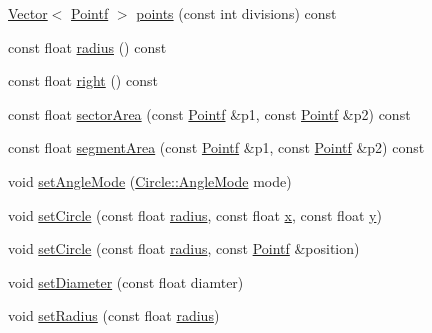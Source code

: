 \begin{DoxyCompactItemize}
\hyperlink{classprism_1_1containers_1_1_vector}{Vector}$<$ \hyperlink{classprism_1_1geometry_1_1_pointf}{Pointf} $>$ \hyperlink{classprism_1_1geometry_1_1_circle_a143bf607852529ec21a1aaaa9c34228f}{points} (const int divisions) const 
\item 
const float \hyperlink{classprism_1_1geometry_1_1_circle_aef97382c1f0b09dca59a0534ac03ed1b}{radius} () const 
\item 
const float \hyperlink{classprism_1_1geometry_1_1_circle_a72e405496fec43913c26325f115755c0}{right} () const 
\item 
const float \hyperlink{classprism_1_1geometry_1_1_circle_ac4151db62b33dc1f0eaaa0280f3334b7}{sector\+Area} (const \hyperlink{classprism_1_1geometry_1_1_pointf}{Pointf} \&p1, const \hyperlink{classprism_1_1geometry_1_1_pointf}{Pointf} \&p2) const 
\item 
const float \hyperlink{classprism_1_1geometry_1_1_circle_af11d03eb5478214c8680c3f5447b268d}{segment\+Area} (const \hyperlink{classprism_1_1geometry_1_1_pointf}{Pointf} \&p1, const \hyperlink{classprism_1_1geometry_1_1_pointf}{Pointf} \&p2) const 
\item 
void \hyperlink{classprism_1_1geometry_1_1_circle_a8a77497a3f3ba3283fd80c0b8830753f}{set\+Angle\+Mode} (\hyperlink{classprism_1_1geometry_1_1_circle_abf09b3319057626836fd7446ee1ac074}{Circle\+::\+Angle\+Mode} mode)
\item 
void \hyperlink{classprism_1_1geometry_1_1_circle_a2fd9a16d24f310e4dddbcd8ca2b93d60}{set\+Circle} (const float \hyperlink{classprism_1_1geometry_1_1_circle_aef97382c1f0b09dca59a0534ac03ed1b}{radius}, const float \hyperlink{classprism_1_1geometry_1_1_circle_aeb38df0ed8d1b3b84c4eb42b50a05348}{x}, const float \hyperlink{classprism_1_1geometry_1_1_circle_aea5997071a76ee672b6b7ec0908ebe11}{y})
\item 
void \hyperlink{classprism_1_1geometry_1_1_circle_ac11c26d7c418f319f4848bbfc50af684}{set\+Circle} (const float \hyperlink{classprism_1_1geometry_1_1_circle_aef97382c1f0b09dca59a0534ac03ed1b}{radius}, const \hyperlink{classprism_1_1geometry_1_1_pointf}{Pointf} \&position)
\item 
void \hyperlink{classprism_1_1geometry_1_1_circle_a2cccd7bd93d5522b95e9b61a615e5d5b}{set\+Diameter} (const float diamter)
\item 
void \hyperlink{classprism_1_1geometry_1_1_circle_ac09a0b4d6b1603b8da53fb8c4b6968b2}{set\+Radius} (const float \hyperlink{classprism_1_1geometry_1_1_circle_aef97382c1f0b09dca59a0534ac03ed1b}{radius})
\item 

\end{DoxyCompactItemize}
